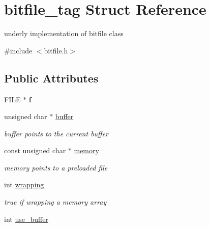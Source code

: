 \hypertarget{structbitfile__tag}{\section{bitfile\+\_\+tag Struct Reference}
\label{structbitfile__tag}
}


underly implementation of bitfile class  




{\ttfamily \#include $<$bitfile.\+h$>$}

\subsection*{Public Attributes}
\begin{DoxyCompactItemize}
\item 
\hypertarget{structbitfile__tag_ab797357514551ac241e79fe020cd31c7}{F\+I\+L\+E $\ast$ {\bfseries f}}\label{structbitfile__tag_ab797357514551ac241e79fe020cd31c7}

\item 
\hypertarget{structbitfile__tag_a809adc303e41e20ad5c7a9a1dc607ac1}{unsigned char $\ast$ \hyperlink{structbitfile__tag_a809adc303e41e20ad5c7a9a1dc607ac1}{buffer}}\label{structbitfile__tag_a809adc303e41e20ad5c7a9a1dc607ac1}

\begin{DoxyCompactList}\small\item\em buffer points to the current buffer \end{DoxyCompactList}\item 
\hypertarget{structbitfile__tag_a0e3d8c81ed8b1884ac07b349bd763cb9}{const unsigned char $\ast$ \hyperlink{structbitfile__tag_a0e3d8c81ed8b1884ac07b349bd763cb9}{memory}}\label{structbitfile__tag_a0e3d8c81ed8b1884ac07b349bd763cb9}

\begin{DoxyCompactList}\small\item\em memory points to a preloaded file \end{DoxyCompactList}\item 
\hypertarget{structbitfile__tag_a7a3e13549e0c5851d6623aab82b38ad4}{int \hyperlink{structbitfile__tag_a7a3e13549e0c5851d6623aab82b38ad4}{wrapping}}\label{structbitfile__tag_a7a3e13549e0c5851d6623aab82b38ad4}

\begin{DoxyCompactList}\small\item\em true if wrapping a memory array \end{DoxyCompactList}\item 
\hypertarget{structbitfile__tag_aeb0611be10e73b42a87cf744e5eeec40}{int \hyperlink{structbitfile__tag_aeb0611be10e73b42a87cf744e5eeec40}{use\+\_\+buffer}}\label{structbitfile__tag_aeb0611be10e73b42a87cf744e5eeec40}


\end{DoxyCompactItemize}
